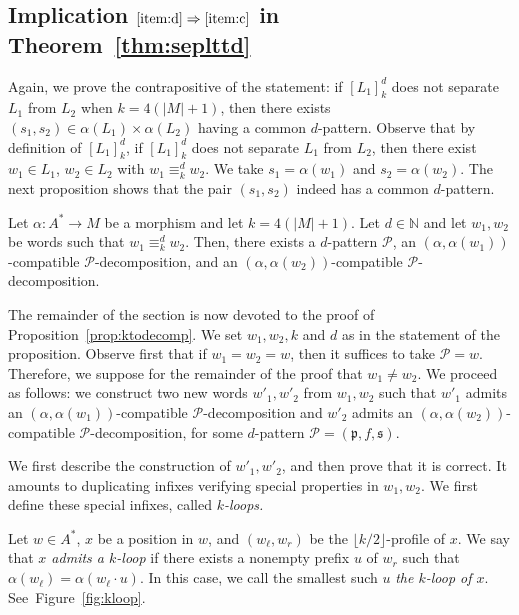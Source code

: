 \documentclass{LMCS}
\newcommand\nat{\ensuremath{\mathbb{N}}\xspace}
\newcommand\Ps{\ensuremath{\mathcal{P}}\xspace}
\newcommand\kloop{$k$-loop\xspace}
\newcommand\kloops{$k$-loops\xspace}
\newcommand\profile[1]{$#1$-profile\xspace}
\newcommand\ltteq[2]{\ensuremath{\equiv_{#1}^{#2}}\xspace}
\newcommand\kdltteq{\ltteq{k}{d}}
\newcommand{\lttclos}[3]{\ensuremath{[#1]_{#2}^{#3}}}
\newcommand\decop[1]{\ensuremath{#1}-decomposition\xspace}
\newcommand\pfsdecomp{\decop{\Ps}}
\newcommand\frp{\ensuremath{\mathfrak{p}}\xspace}
\newcommand\frs{\ensuremath{\mathfrak{s}}\xspace}
\theoremstyle{plain}
\begin{document}
\subsection{\texorpdfstring{Implication $\eqref{item:d} \Rightarrow
    \eqref{item:c}$ in Theorem~\ref{thm:seplttd}}{Implication (\ref{item:d})
    => (\ref{item:c}) in Theorem~\ref{thm:seplttd}}} Again, we prove the
contrapositive of the statement: if $\lttclos{L_1}{k}{d}$ does not separate
$L_1$ from $L_2$ when $k=4(|M|+1)$, then there exists $(s_1,s_2)\in
\alpha(L_1)\times\alpha(L_2)$ having a common $d$-pattern. Observe that by
definition of $\lttclos{L_1}{k}{d}$, if $\lttclos{L_1}{k}{d}$ does not
separate $L_1$ from $L_2$, then there exist $w_1 \in L_1$, $w_2\in L_2$ with
$w_1 \kdltteq w_2$. We take $s_1=\alpha(w_1)$ and $s_2=\alpha(w_2)$. The
next proposition shows that the pair $(s_1,s_2)$ indeed has a common $d$-pattern.

\begin{prop} \label{prop:ktodecomp} Let $\alpha:A^*\to M$
 be a morphism and let $k=4(|M|+1)$. Let $d
  \in \nat$ and let $w_1,w_2$ be words such that $w_1 \kdltteq
  w_2$. Then, there exists a $d$-pattern \Ps, an
  $(\alpha,\alpha(w_1))$-compatible \pfsdecomp, and an
  $(\alpha,\alpha(w_2))$-compatible \pfsdecomp.
\end{prop}

The remainder of the section is now devoted to the proof of
Proposition~\ref{prop:ktodecomp}. We set $w_1,w_2,k$ and $d$ as in the
statement of the proposition. Observe first that if $w_1=w_2=w$, then it suffices to
take $\Ps=w$. Therefore, we suppose for the remainder of the proof
that $w_1 \neq w_2$. We proceed as follows: we construct two new words
$w'_1,w'_2$ from $w_1,w_2$ such that $w'_1$ admits an
$(\alpha,\alpha(w_1))$-compatible \pfsdecomp and $w'_2$ admits an
$(\alpha,\alpha(w_2))$-compatible \pfsdecomp, for some $d$-pattern
$\Ps=(\frp,f,\frs)$.

\smallskip
We first describe the construction of $w'_1,w'_2$, and then prove that
it is correct. It amounts to duplicating infixes verifying special
properties in $w_1,w_2$. We first define these special infixes,
called \emph{\kloops.}

\medskip\noindent {\bf \kloops.} Let $w \in A^{*}$, $x$ be a
position in $w$, and $(w_\ell,w_r)$ be the \profile{\lfloor
  k/2\rfloor} of $x$. We say that \emph{$x$ admits a \kloop} if there
exists a nonempty prefix $u$ of $w_r$ such that $\alpha(w_\ell) =
\alpha(w_\ell \cdot u)$.  In this case, we call the smallest such $u$ \emph{the
  \kloop of $x$}. See~Figure~\ref{fig:kloop}.
\end{document}
